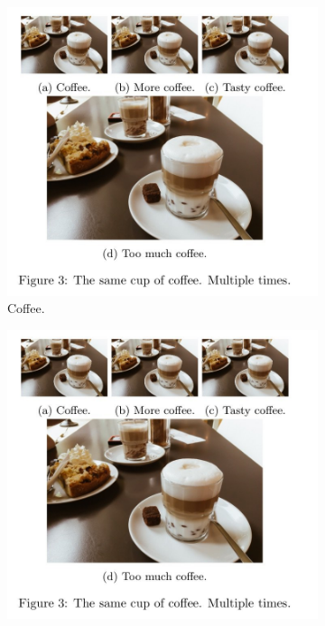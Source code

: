 \documentclass{article}
\begin{document}
\begin{figure}[h!]
  \centering
  \begin{subfigure}[b]{0.2\linewidth}
    \includegraphics[width=\linewidth]{coffee.jpg}
     \caption{Coffee.}
  \end{subfigure}
  \begin{subfigure}[b]{0.2\linewidth}
    \includegraphics[width=\linewidth]{coffee.jpg}

\end{subfigure}
\end{figure}
\end{document}
